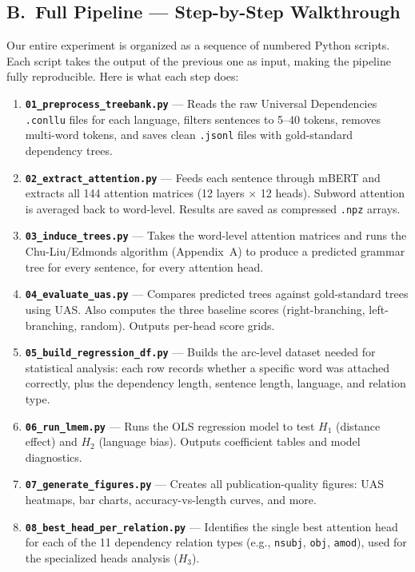 \documentclass[11pt, a4paper]{article}
\begin{document}
\subsection*{B.\ Full Pipeline --- Step-by-Step Walkthrough}

Our entire experiment is organized as a sequence of numbered Python scripts. Each script takes the output of the previous one as input, making the pipeline fully reproducible. Here is what each step does:

\begin{enumerate}\setlength\itemsep{2pt}
    \item \textbf{\texttt{01\_preprocess\_treebank.py}} --- Reads the raw Universal Dependencies \texttt{.conllu} files for each language, filters sentences to 5--40 tokens, removes multi-word tokens, and saves clean \texttt{.jsonl} files with gold-standard dependency trees.
    \item \textbf{\texttt{02\_extract\_attention.py}} --- Feeds each sentence through mBERT and extracts all 144 attention matrices (12 layers $\times$ 12 heads). Subword attention is averaged back to word-level. Results are saved as compressed \texttt{.npz} arrays.
    \item \textbf{\texttt{03\_induce\_trees.py}} --- Takes the word-level attention matrices and runs the Chu-Liu/Edmonds algorithm (Appendix~A) to produce a predicted grammar tree for every sentence, for every attention head.
    \item \textbf{\texttt{04\_evaluate\_uas.py}} --- Compares predicted trees against gold-standard trees using UAS. Also computes the three baseline scores (right-branching, left-branching, random). Outputs per-head score grids.
    \item \textbf{\texttt{05\_build\_regression\_df.py}} --- Builds the arc-level dataset needed for statistical analysis: each row records whether a specific word was attached correctly, plus the dependency length, sentence length, language, and relation type.
    \item \textbf{\texttt{06\_run\_lmem.py}} --- Runs the OLS regression model to test $H_1$ (distance effect) and $H_2$ (language bias). Outputs coefficient tables and model diagnostics.
    \item \textbf{\texttt{07\_generate\_figures.py}} --- Creates all publication-quality figures: UAS heatmaps, bar charts, accuracy-vs-length curves, and more.
    \item \textbf{\texttt{08\_best\_head\_per\_relation.py}} --- Identifies the single best attention head for each of the 11 dependency relation types (e.g., \texttt{nsubj}, \texttt{obj}, \texttt{amod}), used for the specialized heads analysis ($H_3$).

\end{enumerate}
\end{document}
